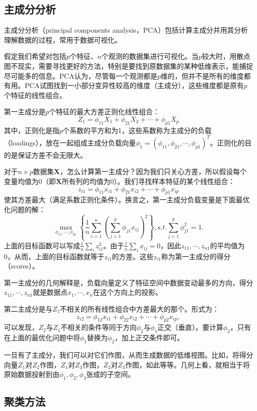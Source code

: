 \documentclass[hyperref,]{ctexart}
\begin{document}
\subsection{主成分分析}

主成分分析（principal components
analysis，PCA）包括计算主成分并用其分析理解数据的过程，常用于数据可视化。

假定我们希望对包括\(p\)个特征、\(n\)个观测的数据集进行可视化。当\(p\)较大时，用散点图不现实，需要寻找更好的方法，特别是要找到原数据集的某种低维表示，能捕捉尽可能多的信息。PCA认为，尽管每一个观测都是\(p\)维的，但并不是所有的维度都有用。PCA试图找到一小部分变异性较高的维度（主成分），这些维度都是原有\(p\)个特征的线性组合。

第一主成分是\(p\)个特征的最大方差正则化线性组合：
\[Z_1=\phi_{11}X_1+\phi_{21}X_2+\cdots+\phi_{p1}X_p\]
其中，正则化是指\(p\)个系数的平方和为1，这些系数称为主成分的负载（loadings），放在一起组成主成分负载向量\(\phi_1=(\phi_{11},\phi_{21},\cdots,\phi_{p1})^T\)。正则化的目的是保证方差不会无限大。

对于\(n\times p\)数据集\(\mathbf{X}\)，怎么计算第一主成分？因为我们只关心方差，所以假设每个变量均值为0（即\(\mathbf{X}\)所有列的均值为0）。我们寻找样本特征的某个线性组合：
\[z_{i1}=\phi_{11}x_{i1}+\phi_{21}x_{i2}+\cdots+\phi_{p1}x_{ip}\]
使其方差最大（满足系数正则化条件）。换言之，第一主成分负载变量是下面最优化问题的解：
\[\max_{\phi_{11},\cdots,\phi_{p1}}\left \{ \frac{1}{n}\sum_{i=1}^n \left(\sum_{j=1}^p\phi_{j1}x_{ij}\right)^2 \right\},  s.t. \sum_{j=1}^p\phi_{j1}^2=1.\]
上面的目标函数可以写成\(\frac{1}{n}\sum_i z_{i1}^2\)。由于\(\frac{1}{n}\sum_i x_{ij}=0\)，因此\(z_{11},\cdots,z_{n1}\)的平均值为0，从而，上面的目标函数就等于\(z_{i1}\)的方差。这些\(z_{i1}\)称为第一主成分的得分（scores）。

第一主成分的几何解释是，负载向量定义了特征空间中数据变动最多的方向，得分\(z_{11},\cdots,z_{n1}\)就是数据点\(x_1,\cdots,x_n\)在这个方向上的投影。

第二主成分是与\(Z_1\)不相关的所有线性组合中方差最大的那个。形式为：
\[z_{i2}=\phi_{12}x_{i1}+\phi_{22}x_{i2}+\cdots+\phi_{p2}x_{ip},\]
可以发现，\(Z_2\)与\(Z_1\)不相关的条件等同于方向\(\phi_2\)与\(\phi_1\)正交（垂直）。要计算\(\phi_2\)，只有在上面的最优化问题中将\(\phi_1\)替换为\(\phi_2\)，加上正交条件即可。

一旦有了主成分，我们可以对它们作图，从而生成数据的低维视图。比如，将得分向量\(Z_1\)对\(Z_2\)作图，\(Z_1\)对\(Z_3\)作图，\(Z_2\)对\(Z_3\)作图，如此等等。几何上看，就相当于将原始数据投射到由\(\phi_1,\phi_2,\phi_3\)张成的子空间。

\subsection{聚类方法}
\end{document}

